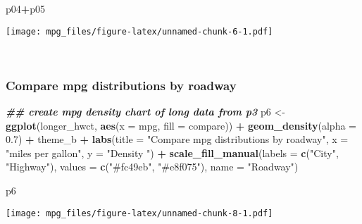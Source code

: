 \documentclass[
]{article}
\newenvironment{Shaded}{\begin{snugshade}}{\end{snugshade}}
\newcommand{\AttributeTok}[1]{\textcolor[rgb]{0.13,0.29,0.53}{#1}}
\newcommand{\DocumentationTok}[1]{\textcolor[rgb]{0.56,0.35,0.01}{\textbf{\textit{#1}}}}
\newcommand{\FloatTok}[1]{\textcolor[rgb]{0.00,0.00,0.81}{#1}}
\newcommand{\FunctionTok}[1]{\textcolor[rgb]{0.13,0.29,0.53}{\textbf{#1}}}
\newcommand{\NormalTok}[1]{#1}
\newcommand{\OtherTok}[1]{\textcolor[rgb]{0.56,0.35,0.01}{#1}}
\newcommand{\SpecialCharTok}[1]{\textcolor[rgb]{0.81,0.36,0.00}{\textbf{#1}}}
\newcommand{\StringTok}[1]{\textcolor[rgb]{0.31,0.60,0.02}{#1}}
\begin{document}
\begin{Shaded}
\begin{Highlighting}[]
\NormalTok{p04}\SpecialCharTok{+}\NormalTok{p05}
\end{Highlighting}
\end{Shaded}

\texttt{[image: mpg\_files/figure-latex/unnamed-chunk-6-1.pdf]}\\
\strut \\

\hypertarget{compare-mpg-distributions-by-roadway}{%
\subsubsection{\texorpdfstring{\textbf{Compare mpg distributions by
roadway}}{Compare mpg distributions by roadway}}\label{compare-mpg-distributions-by-roadway}}

\begin{Shaded}
\begin{Highlighting}[]
\DocumentationTok{\#\# create mpg density chart of long data from p3}
\NormalTok{p6 }\OtherTok{\textless{}{-}} \FunctionTok{ggplot}\NormalTok{(longer\_hwct, }\FunctionTok{aes}\NormalTok{(}\AttributeTok{x =}\NormalTok{ mpg, }\AttributeTok{fill =}\NormalTok{ compare)) }\SpecialCharTok{+}
  \FunctionTok{geom\_density}\NormalTok{(}\AttributeTok{alpha =} \FloatTok{0.7}\NormalTok{) }\SpecialCharTok{+}\NormalTok{ theme\_b }\SpecialCharTok{+}
  \FunctionTok{labs}\NormalTok{(}\AttributeTok{title =} \StringTok{"Compare mpg distributions by roadway"}\NormalTok{,}
       \AttributeTok{x =} \StringTok{"miles per gallon"}\NormalTok{,}
       \AttributeTok{y =} \StringTok{"Density "}\NormalTok{) }\SpecialCharTok{+}
  \FunctionTok{scale\_fill\_manual}\NormalTok{(}\AttributeTok{labels =} \FunctionTok{c}\NormalTok{(}\StringTok{"City"}\NormalTok{, }\StringTok{"Highway"}\NormalTok{), }
                    \AttributeTok{values =} \FunctionTok{c}\NormalTok{(}\StringTok{"\#fc49eb"}\NormalTok{, }\StringTok{"\#e8f075"}\NormalTok{),}
                    \AttributeTok{name =} \StringTok{"Roadway"}\NormalTok{)}
\end{Highlighting}
\end{Shaded}

\begin{Shaded}
\begin{Highlighting}[]
\NormalTok{p6}
\end{Highlighting}
\end{Shaded}

\texttt{[image: mpg\_files/figure-latex/unnamed-chunk-8-1.pdf]}\\
\strut \\
\end{document}
